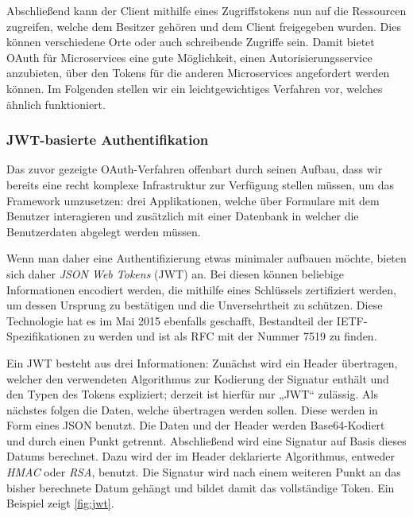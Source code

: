 Abschließend kann der Client mithilfe eines Zugriffstokens nun auf die Ressourcen zugreifen, welche dem Besitzer gehören und dem Client freigegeben wurden. Dies können verschiedene Orte oder auch schreibende Zugriffe sein. Damit bietet OAuth für Microservices eine gute Möglichkeit, einen Autorisierungsservice anzubieten, über den Tokens für die anderen Microservices angefordert werden können. Im Folgenden stellen wir ein leichtgewichtiges Verfahren vor, welches ähnlich funktioniert.


\subsubsection{JWT-basierte Authentifikation}
\label{subsubsec:jwt}

Das zuvor gezeigte OAuth-Verfahren offenbart durch seinen Aufbau, dass wir bereits eine recht komplexe Infrastruktur zur Verfügung stellen müssen, um das Framework umzusetzen: drei Applikationen, welche über Formulare mit dem Benutzer interagieren und zusätzlich mit einer Datenbank in welcher die Benutzerdaten abgelegt werden müssen.

Wenn man daher eine Authentifizierung etwas minimaler aufbauen möchte, bieten sich daher \textit{JSON Web Tokens} (JWT) an. Bei diesen können beliebige Informationen encodiert werden, die mithilfe eines Schlüssels zertifiziert werden, um dessen Ursprung zu bestätigen und die Unversehrtheit zu schützen. Diese Technologie hat es im Mai 2015 ebenfalls geschafft, Bestandteil der IETF-Spezifikationen zu werden und ist als RFC mit der Nummer 7519 zu finden. \cite{RFC7519}

Ein JWT besteht aus drei Informationen: Zunächst wird ein Header übertragen, welcher den verwendeten Algorithmus zur Kodierung der Signatur enthält und den Typen des Tokens expliziert; derzeit ist hierfür nur „JWT“ zulässig. Als nächstes folgen die Daten, welche übertragen werden sollen. Diese werden in Form eines JSON benutzt. Die Daten und der Header werden Base64-Kodiert und durch einen Punkt getrennt. Abschließend wird eine Signatur auf Basis dieses Datums berechnet. Dazu wird der im Header deklarierte Algorithmus, entweder \textit{HMAC} oder \textit{RSA}, benutzt. Die Signatur wird nach einem weiteren Punkt an das bisher berechnete Datum gehängt und bildet damit das vollständige Token. Ein Beispiel zeigt \autoref{fig:jwt}.


